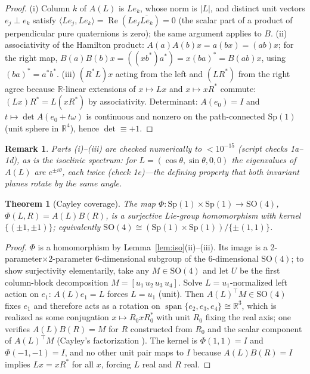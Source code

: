 \documentclass{article}
\newtheorem{theorem}{Theorem}
\newtheorem{remark}{Remark}
\newcommand{\R}{\mathbb{R}}
\newcommand{\SO}{\mathrm{SO}}
\newcommand{\Sp}{\mathrm{Sp}}
\newcommand{\inner}[2]{\langle #1, #2 \rangle}
\begin{document}
\begin{proof}
(i) Column $k$ of $A(L)$ is $Le_k$, whose norm is $|L|$, and distinct unit
vectors $e_j\perp e_k$ satisfy $\inner{Le_j}{Le_k}=\operatorname{Re}(Le_j\overline{Le_k})=0$
(the scalar part of a product of perpendicular pure quaternions is zero); the
same argument applies to $B$. (ii) associativity of the Hamilton product:
$A(a)A(b)x=a(bx)=(ab)x$; for the right map,
$B(a)B(b)x=((xb^{*})a^{*})=x(ba)^{*}=B(ab)x$, using
$(ba)^{*}=a^{*}b^{*}$. (iii) $(R^{*}L)x$ acting from the left and
$(LR^{*})$ from the right agree because $\R$-linear extensions of
$x\mapsto Lx$ and $x\mapsto xR^{*}$ commute: $(Lx)R^{*}=L(xR^{*})$ by
associativity. Determinant: $A(e_0)=I$ and $t\mapsto\det A(e_0+t\omega)$ is
continuous and nonzero on the path-connected $\Sp(1)$ (unit sphere in $\R^4$),
hence $\det\equiv+1$.
\end{proof}

\begin{remark}
Parts (i)--(iii) are checked numerically to $<10^{-15}$ (script checks 1a--1d),
as is the isoclinic spectrum: for $L=(\cos\theta,\sin\theta,0,0)$ the
eigenvalues of $A(L)$ are $e^{\pm i\theta}$, each twice (check 1e)---the
defining property that both invariant planes rotate by the same angle.
\end{remark}

\begin{theorem}[Cayley coverage]
\label{thm:cayley}
The map $\Phi:\Sp(1)\times\Sp(1)\to\SO(4)$, $\Phi(L,R)=A(L)B(R)$, is a
surjective Lie-group homomorphism with kernel $\{(\pm1,\pm1)\}$; equivalently
$\SO(4)\cong(\Sp(1)\times\Sp(1))/\{\pm(1,1)\}$.
\end{theorem}

\begin{proof}
$\Phi$ is a homomorphism by Lemma~\ref{lem:iso}(ii)--(iii). Its image is a
2-parameter$\times$2-parameter 6-dimensional subgroup of the 6-dimensional
$\SO(4)$; to show surjectivity elementarily, take any $M\in\SO(4)$ and let $U$
be the first column-block decomposition $M=[u_1\,u_2\,u_3\,u_4]$. Solve
$L=u_1$-normalized left action on $e_1$: $A(L)e_1=L$ forces $L=u_1$ (unit).
Then $A(L)^\top M\in\SO(4)$ fixes $e_1$ and therefore acts as a rotation on
$\operatorname{span}\{e_2,e_3,e_4\}\cong\R^3$, which is realized as some
conjugation $x\mapsto R_0xR_0^{*}$ with unit $R_0$ fixing the real axis;
one verifies $A(L)B(R)=M$ for $R$ constructed from $R_0$ and the scalar
component of $A(L)^\top M$ (Cayley's factorization
\citep{thomas2015cayley}). The kernel is $\Phi(1,1)=I$ and
$\Phi(-1,-1)=I$, and no other unit pair maps to $I$ because
$A(L)B(R)=I$ implies $Lx=xR^{*}$ for all $x$, forcing $L$ real and $R$ real.
\end{proof}
\end{document}
